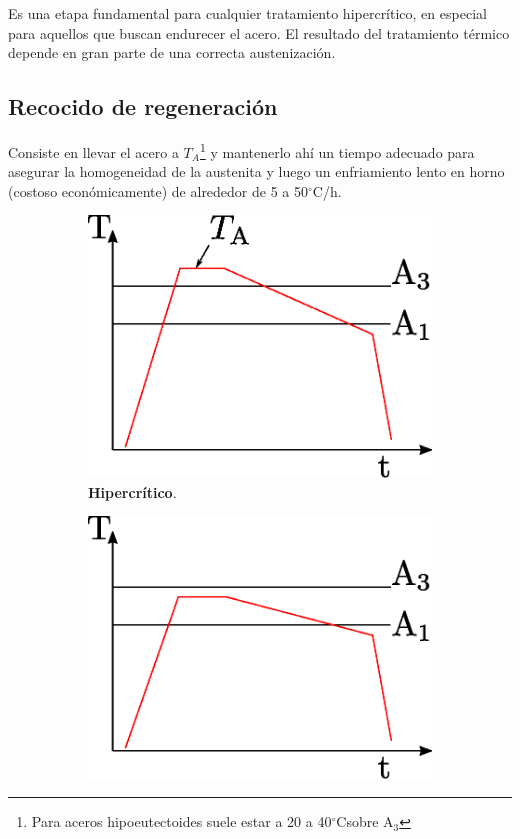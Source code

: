 \documentclass{article}
\newcommand{\Athree}{A\ensuremath{_{3}}}
\newcommand{\grad}{\ensuremath{^\circ \mathrm{C}}}
\begin{document}
Es una etapa fundamental para cualquier tratamiento hipercrítico, en especial para aquellos que buscan endurecer el acero. El resultado del tratamiento térmico depende en gran parte de una correcta austenización.

\subsection{Recocido de regeneración}
Consiste en llevar el acero a $T_A$\footnote{Para aceros hipoeutectoides suele estar a 20 a 40\grad sobre \Athree{}} y mantenerlo ahí un tiempo adecuado para asegurar la homogeneidad de la austenita y luego un enfriamiento lento en horno (costoso económicamente) de alrededor de 5 a 50\grad/h.

\begin{figure}[htb!]
\centering
\begin{subfigure}{0.4\textwidth}
    \includegraphics[width=\linewidth]{fig/TTrecoreg.eps}
    \caption{\textbf{Hipercrítico}.}
    \label{fig:TTrecoreg}
\end{subfigure}
\begin{subfigure}{0.4\textwidth}
    \includegraphics[width=\linewidth]{fig/TTrecoreghiper.eps}

\end{subfigure}
\end{figure}
\end{document}

